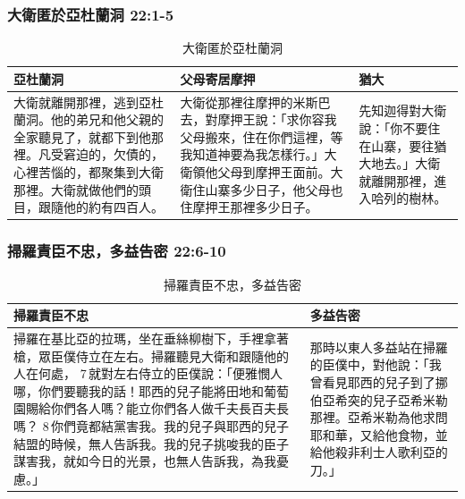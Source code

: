 \subsubsection{大衛匿於亞杜蘭洞 22:1-5}
\begin{table}[H]
\centering 
\begin{tabular}{p{6.7cm}|p{6.5cm}|p{3.25cm}}\hline\hline
亞杜蘭洞&父母寄居摩押&猶大\\\hline
大衛就離開那裡，逃到亞杜蘭洞。他的弟兄和他父親的全家聽見了，就都下到他那裡。凡受窘迫的，欠債的，心裡苦惱的，都聚集到大衛那裡。大衛就做他們的頭目，跟隨他的約有四百人。&大衛從那裡往摩押的米斯巴去，對摩押王說：「求你容我父母搬來，住在你們這裡，等我知道神要為我怎樣行。」大衛領他父母到摩押王面前。大衛住山寨多少日子，他父母也住摩押王那裡多少日子。 &先知迦得對大衛說：「你不要住在山寨，要往猶大地去。」大衛就離開那裡，進入哈列的樹林。\\\hline
\end{tabular}
\caption{大衛匿於亞杜蘭洞}
\end{table}

\subsubsection{掃羅責臣不忠，多益告密 22:6-10}
\begin{table}[H]
\centering 
\begin{tabular}{p{11.5cm}|p{5.5cm}}\hline\hline
掃羅責臣不忠&多益告密\\\hline
掃羅在基比亞的拉瑪，坐在垂絲柳樹下，手裡拿著槍，眾臣僕侍立在左右。掃羅聽見大衛和跟隨他的人在何處， 7 就對左右侍立的臣僕說：「便雅憫人哪，你們要聽我的話！耶西的兒子能將田地和葡萄園賜給你們各人嗎？能立你們各人做千夫長百夫長嗎？ 8 你們竟都結黨害我。我的兒子與耶西的兒子結盟的時候，無人告訴我。我的兒子挑唆我的臣子謀害我，就如今日的光景，也無人告訴我，為我憂慮。」 &那時以東人多益站在掃羅的臣僕中，對他說：「我曾看見耶西的兒子到了挪伯亞希突的兒子亞希米勒那裡。亞希米勒為他求問耶和華，又給他食物，並給他殺非利士人歌利亞的刀。」\\\hline
\end{tabular}
\caption{掃羅責臣不忠，多益告密 }
\end{table}

